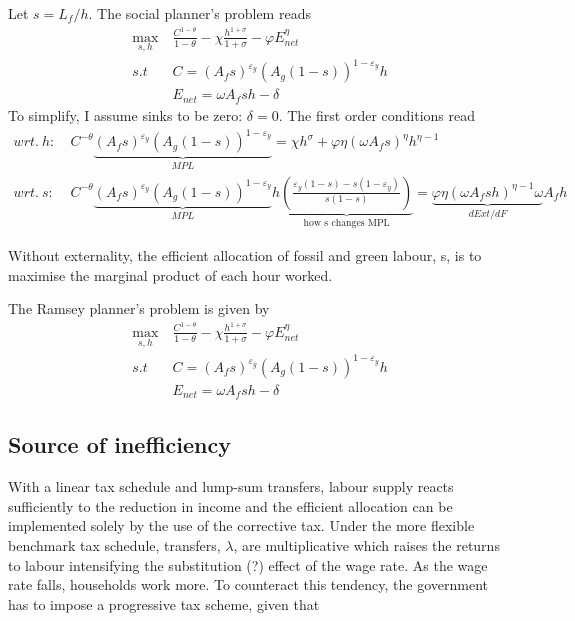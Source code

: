 Let $s=L_f/h$. The social planner's problem reads
\begin{align}
\underset{s, h}{\max}\ & \frac{C^{1-\theta}}{1-\theta}-\chi \frac{h^{1+\sigma}}{1+\sigma}-\varphi E_{net}^{\eta}\\
s.t\ \ & C=\left(A_fs\right)^{\varepsilon_y}\left(A_g(1-s)\right)^{1-\varepsilon_y}h\\
& E_{net}=\omega A_fsh-\delta
\end{align}
To simplify, I assume sinks to be zero: $\delta=0$.
The first order conditions read
\begin{align}
wrt.\ h:\ & C^{-\theta}\underbrace{(A_fs)^{\varepsilon_y}(A_g(1-s))^{1-\varepsilon_y}}_{MPL}=\chi h^\sigma+\varphi \eta (\omega A_f s)^\eta h^{\eta-1}\\
wrt.\ s:\ & C^{-\theta}\underbrace{(A_fs)^{\varepsilon_y}(A_g(1-s))^{1-\varepsilon_y}}_{MPL}h\underbrace{\left(\frac{\varepsilon_y(1-s)-s(1-\varepsilon_y)}{s(1-s)}\right)}_{\text{how s changes MPL}}=\underbrace{\varphi \eta (\omega A_f s h)^{\eta-1}\omega }_{dExt/dF} A_f h
\end{align}

Without externality, the efficient allocation of fossil and green labour, s, is to maximise the marginal product of each hour worked.

The Ramsey planner's problem is given by
\begin{align}
\underset{s, h}{\max}\ & \frac{C^{1-\theta}}{1-\theta}-\chi \frac{h^{1+\sigma}}{1+\sigma}-\varphi E_{net}^{\eta}\\
s.t\ \ & C=\left(A_fs\right)^{\varepsilon_y}\left(A_g(1-s)\right)^{1-\varepsilon_y}h\\
& E_{net}=\omega A_fsh-\delta
\end{align}

\subsection{Source of inefficiency}
With a linear tax schedule and lump-sum transfers, labour supply reacts sufficiently to the reduction in income and the efficient allocation can be implemented solely by the use of the corrective tax. Under the more flexible benchmark tax schedule, transfers, $\lambda$, are multiplicative which raises the returns to labour intensifying the substitution (?) effect of the wage rate. As the wage rate falls, households work more. To counteract this tendency, the government has to impose a progressive tax scheme, given that 